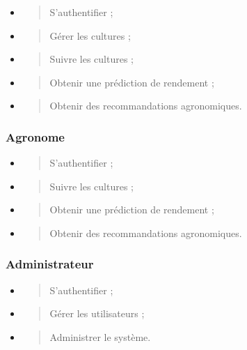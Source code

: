 \documentclass[
]{book}
\begin{document}
\begin{itemize}
\item
  \begin{quote}
  S'authentifier ;
  \end{quote}
\item
  \begin{quote}
  Gérer les cultures ;
  \end{quote}
\item
  \begin{quote}
  Suivre les cultures ;
  \end{quote}
\item
  \begin{quote}
  Obtenir une prédiction de rendement ;
  \end{quote}
\item
  \begin{quote}
  Obtenir des recommandations agronomiques.
  \end{quote}
\end{itemize}

\hypertarget{agronome-1}{%
\subsubsection{Agronome}\label{agronome-1}}

\begin{itemize}
\item
  \begin{quote}
  S'authentifier ;
  \end{quote}
\item
  \begin{quote}
  Suivre les cultures ;
  \end{quote}
\item
  \begin{quote}
  Obtenir une prédiction de rendement ;
  \end{quote}
\item
  \begin{quote}
  Obtenir des recommandations agronomiques.
  \end{quote}
\end{itemize}

\hypertarget{administrateur-1}{%
\subsubsection{Administrateur}\label{administrateur-1}}

\begin{itemize}
\item
  \begin{quote}
  S'authentifier ;
  \end{quote}
\item
  \begin{quote}
  Gérer les utilisateurs ;
  \end{quote}
\item
  \begin{quote}
  Administrer le système.
  \end{quote}
\end{itemize}
\end{document}
